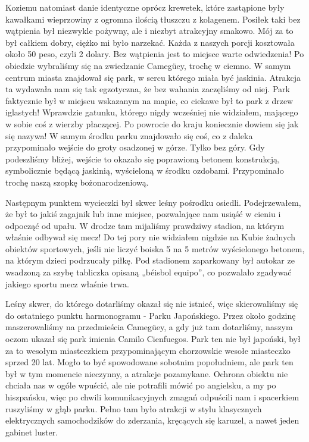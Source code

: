 Koziemu natomiast danie identyczne oprócz krewetek, które zastąpione były kawałkami wieprzowiny z ogromna ilością tłuszczu z kolagenem. 
Posiłek taki bez wątpienia był niezwykle pożywny, ale i niezbyt atrakcyjny smakowo.
Mój za to był całkiem dobry, ciężko mi było narzekać. 
Każda z naszych porcji kosztowała około 50 peso, czyli 2 dolary.
Bez wątpienia jest to miejsce warte odwiedzenia!
Po obiedzie wybraliśmy się na zwiedzanie Camegüey, trochę w ciemno. 
W samym centrum miasta znajdował się park, w sercu którego miała być jaskinia.
Atrakcja ta wydawała nam się tak egzotyczna, że bez wahania zaczęliśmy od niej. 
Park faktycznie był w miejscu wskazanym na mapie, co ciekawe był to park z drzew iglastych!
Wprawdzie gatunku, którego nigdy wcześniej nie widziałem, mającego w sobie coś z wierzby płaczącej. 
Po powrocie do kraju koniecznie dowiem się jak się nazywa!
W samym środku parku znajdowało się coś, co z daleka przypominało wejście do groty osadzonej w górze.
Tylko bez góry. 
Gdy podeszliśmy bliżej, wejście to okazało się poprawioną betonem konstrukcją, symbolicznie będącą jaskinią, wyścieloną w środku ozdobami. Przypominało trochę naszą szopkę bożonarodzeniową.
\par Następnym punktem wycieczki był skwer leśny pośrodku osiedli. 
Podejrzewałem, że był to jakiś zagajnik lub inne miejsce, pozwalające nam usiąść w cieniu i odpocząć od upału.
W drodze tam mijaliśmy prawdziwy stadion, na którym właśnie odbywał się mecz! 
Do tej pory nie widziałem nigdzie na Kubie żadnych obiektów sportowych, jeśli nie liczyć boiska 5 na 5 metrów wyścielonego betonem, na którym dzieci podrzucały piłkę. 
Pod stadionem zaparkowany był autokar ze wsadzoną za szybę tabliczka opisaną „béisbol equipo”, co pozwalało zgadywać jakiego sportu mecz właśnie trwa.
\par Leśny skwer, do którego dotarliśmy okazał się nie istnieć, więc skierowaliśmy się do ostatniego punktu harmonogramu - Parku Japońskiego. 
Przez około godzinę maszerowaliśmy na przedmieścia Camegüey, a gdy już tam dotarliśmy, naszym oczom ukazał się park imienia Camilo Cienfuegos. 
Park ten nie był japoński, był za to wesołym miasteczkiem przypominającym chorzowskie wesołe miasteczko sprzed 20 lat. 
Mogło to być spowodowane sobotnim popołudniem, ale park ten był w tym momencie nieczynny, a atrakcje pozamykane. 
Ochrona obiektu nie chciała nas w ogóle wpuścić, ale nie potrafili mówić po angielsku, a my po hiszpańsku, więc po chwili komunikacyjnych zmagań odpuścili nam i spacerkiem ruszyliśmy w głąb parku. 
Pełno tam było atrakcji w stylu klasycznych elektrycznych samochodzików do zderzania, kręcących się karuzel, a nawet jeden gabinet luster.
